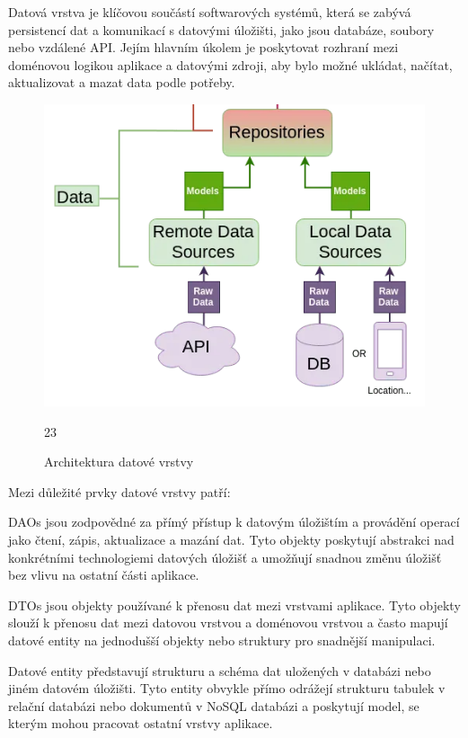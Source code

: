 Datová vrstva je klíčovou součástí softwarových systémů, která se zabývá persistencí dat a komunikací s datovými úložišti, jako jsou
 databáze, soubory nebo vzdálené API. Jejím hlavním úkolem je poskytovat rozhraní mezi doménovou logikou aplikace a datovými zdroji, 
 aby bylo možné ukládat, načítat, aktualizovat a mazat data podle potřeby.



\begin{figure}[H]
  \centering
  \includegraphics[width=.5\textwidth]{data_layer_diagram.png}
  \caption{Architektura datové vrstvy}
  \label{fig:arch_data_layer}23
\end{figure}


Mezi důležité prvky datové vrstvy patří:

DAOs jsou zodpovědné za přímý přístup k datovým úložištím a provádění operací jako čtení, zápis, aktualizace a mazání dat. Tyto objekty 
poskytují abstrakci nad konkrétními technologiemi datových úložišť a umožňují snadnou změnu úložišť bez vlivu na ostatní části aplikace.

DTOs jsou objekty používané k přenosu dat mezi vrstvami aplikace. Tyto objekty slouží k přenosu dat mezi datovou vrstvou a doménovou 
vrstvou a často mapují datové entity na jednodušší objekty nebo struktury pro snadnější manipulaci.

Datové entity představují strukturu a schéma dat uložených v databázi nebo jiném datovém úložišti. Tyto entity obvykle přímo odrážejí
strukturu tabulek v relační databázi nebo dokumentů v NoSQL databázi a poskytují model, se kterým mohou pracovat ostatní vrstvy aplikace.

